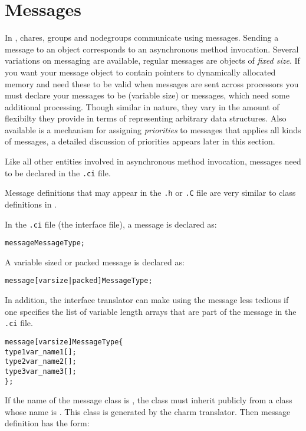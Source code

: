 \section{Messages}

In \charmpp, chares, groups and 
nodegroups communicate using messages. Sending a message  to an
object corresponds to an asynchronous method invocation.  Several variations on
messaging are available, regular \charmpp{} messages are objects of
\textit{fixed size}. If you want your message object to contain pointers to
dynamically allocated memory and need these to be valid when messages are sent
across processors you must declare your messages to be  (variable
size) or  messages, which need some additional processing. Though
similar in nature, they vary in the amount of flexibilty they provide in terms
of representing arbitrary data structures.  Also available is a mechanism for
assigning \textit{priorities} to messages that applies all kinds of messages, a
detailed discussion of priorities appears later in this section.

Like all other entities involved in asynchronous method invocation, messages
need to be declared in the {\tt .ci} file.

Message definitions that may appear in the {\tt .h} or {\tt .C} file are very
similar to class definitions in \CC.

In the {\tt .ci} file (the interface file), a message is declared as: 

\begin{alltt}
 message MessageType;
\end{alltt}

A variable sized or packed message is declared as:

\begin{alltt}
 message [varsize|packed] MessageType;
\end{alltt}

In addition, the interface translator can make using the  message 
less tedious if one specifies the list of variable length arrays that are part
of the message in the \texttt{.ci} file.

\begin{alltt}
 message [varsize] MessageType \{
   type1 var_name1[];
   type2 var_name2[];
   type3 var_name3[];
 \};
\end{alltt}

If the name of the message class is , the class must inherit 
publicly from a class whose name is . This class
is generated by the charm translator. Then message definition has the form:

